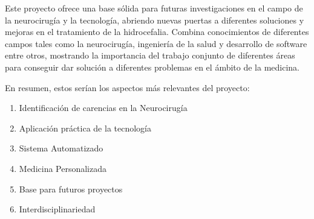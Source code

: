 Este proyecto ofrece una base sólida para futuras investigaciones en el campo de la neurocirugía y la tecnología, abriendo nuevas puertas a diferentes soluciones y mejoras en el tratamiento de la hidrocefalia. Combina conocimientos de diferentes campos tales como la neurocirugía, ingeniería de la salud y desarrollo de software entre otros, mostrando la importancia del trabajo conjunto de diferentes áreas para conseguir dar solución a diferentes problemas en el ámbito de la medicina.

En resumen, estos serían los aspectos más relevantes del proyecto:
\begin{enumerate}
    \item Identificación de carencias en la Neurocirugía
    \item Aplicación práctica de la tecnología
    \item Sistema Automatizado
    \item Medicina Personalizada
    \item Base para futuros proyectos
    \item Interdisciplinariedad
\end{enumerate}







